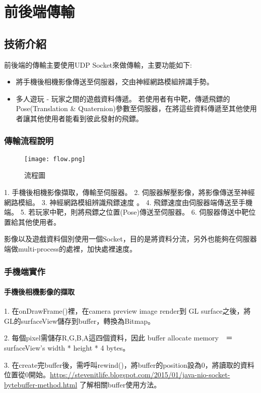 \chapter{前後端傳輸}
\section{技術介紹}
前後端的傳輸主要使用UDP Socket來做傳輸，主要功能如下:
\begin{itemize}
\item 將手機後相機影像傳送至伺服器，交由神經網路模組辨識手勢。
\item 多人遊玩 - 玩家之間的遊戲資料傳遞。 
若使用者有中靶，傳遞飛鏢的Pose(Translation \& Quaternion)參數至伺服器，在將這些資料傳遞至其他使用者讓其他使用者能看到彼此發射的飛鏢。
\end{itemize}
\subsection{傳輸流程說明}
\begin{figure}[h]
    \centering	
    \texttt{[image: flow.png]}
    \caption{流程圖}
    \label{fig:flow}
\end{figure}
1. 手機後相機影像擷取，傳輸至伺服器。
2. 伺服器解壓影像，將影像傳送至神經網路模組。
3. 神經網路模組辨識飛鏢速度 。
4. 飛鏢速度由伺服器端傳送至手機端。
5. 若玩家中靶，則將飛鏢之位置(Pose)傳送至伺服器。
6. 伺服器傳送中靶位置給其他使用者。

影像以及遊戲資料個別使用一個Socket，目的是將資料分流，另外也能夠在伺服器端做multi-process的處裡，加快處裡速度。
\subsection{手機端實作}
\subsubsection{手機後相機影像的擷取}
1. 在onDrawFrame()裡，在camera preview image render到 GL surface之後，將GL的surfaceView儲存到buffer，轉換為Bitmap。

2. 每個pixel需儲存R,G,B,A這四個資料，因此 buffer allocate memory　＝　surfaceView’s width * height * 4 bytes。

3. 在create完buffer後，需呼叫rewind()，將buffer的position設為0，將讀取的資料位置從0開始。\href{可於此處}{https://stevenitlife.blogspot.com/2015/01/java-nio-socket-bytebuffer-method.html} 了解相關buffer使用方法。

